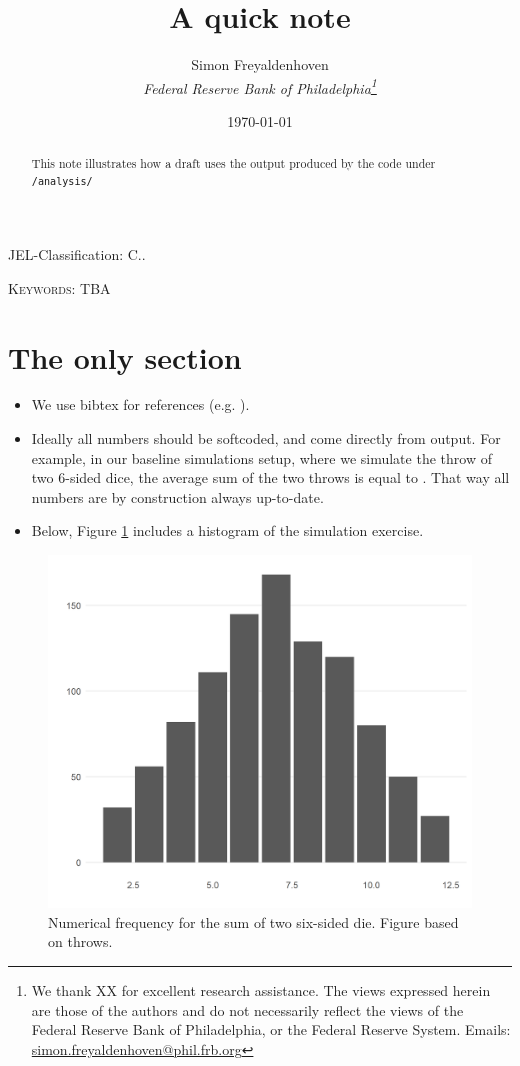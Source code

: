 \documentclass[12pt]{article}
\author{
        Simon Freyaldenhoven\\
        \textit{Federal Reserve Bank of Philadelphia\thanks{We thank XX for excellent research assistance. The views expressed herein are those of the authors and do not necessarily reflect the views of the Federal Reserve Bank of Philadelphia, or the Federal Reserve System. Emails: \href{mailto:simon.freyaldenhoven@phil.frb.org}{simon.freyaldenhoven@phil.frb.org}}}
}
\title{A quick note}
\date{\today}
\theoremstyle{definition}
\begin{document}
\maketitle

\begin{abstract}
\noindent This note illustrates how a draft uses the output produced by the code under \texttt{/analysis/}
\end{abstract}

JEL-Classification: C..

\textsc{Keywords}: TBA

\thispagestyle{empty}
\newpage

\setcounter{page}{1}

\section{The only section}

\begin{itemize}
\item We use bibtex for references (e.g. \cite{Freyaldenhoven2019}). 

\item Ideally all numbers should be softcoded, and come directly from output. For example, in our baseline simulations setup, where we simulate the throw of two 6-sided dice, the average sum of the two throws is equal to \unskip. That way all numbers are by construction always up-to-date.

\item Below, Figure \ref{fig:hist_baseline} includes a histogram of the simulation exercise.
\end{itemize}

\begin{figure}[tbh!]
\centering
\includegraphics[width=.8\linewidth]{baseline/hist.png}
\caption[]{Numerical frequency for the sum of two six-sided die. Figure based on throws.}
\label{fig:hist_baseline}
\end{figure}



%

\end{document}
